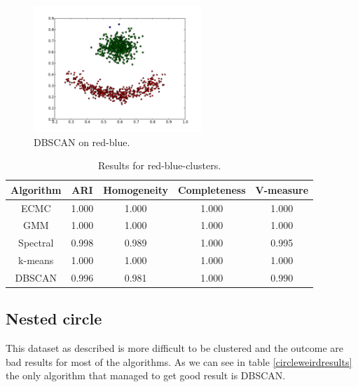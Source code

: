 \documentclass[conference]{IEEEtran}
\begin{document}
\begin{figure}[th]
\centering
\includegraphics[width=15pc]{dbscan_red-blue-clusters.pdf}
\caption{DBSCAN on red-blue.}
\label{DBSCAN_redblue}
\end{figure}

\begin{table}[htbp]
\caption{Results for red-blue-clusters.}
\label{redblueresults}
\begin{center}
\setlength{\tabcolsep}{3pt}
\begin{tabular}{ |c|c|c|c|c| }
\hline
	Algorithm & ARI & Homogeneity & Completeness & V-measure\\ \hline
	
	ECMC & 1.000 & 1.000 & 1.000 & 1.000 \\ \hline
	GMM & 1.000 & 1.000 & 1.000 & 1.000 \\ \hline
	Spectral & 0.998 & 0.989 & 1.000 & 0.995 \\ \hline
	k-means & 1.000 & 1.000 & 1.000 & 1.000 \\ \hline
	DBSCAN & 0.996 & 0.981 & 1.000 & 0.990 \\ \hline
\end{tabular}
\end{center}
\end{table}


\subsection{Nested circle}
This dataset as described is more difficult to be clustered and the outcome are bad results for most of
the algorithms. As we can see in table \ref{circleweirdresults} the only algorithm that managed
to get good result is DBSCAN.
\end{document}
